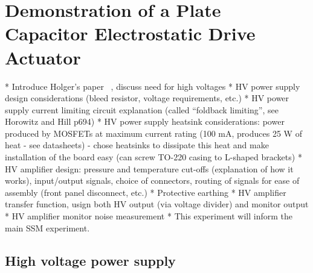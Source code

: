 \chapter{Demonstration of a Plate Capacitor Electrostatic Drive Actuator}
\label{c:esd-concept}

* Introduce Holger's paper~\cite{Wittel2015} \etal, discuss need for high voltages
* HV power supply design considerations (bleed resistor, voltage requirements, etc.)
* HV power supply current limiting circuit explanation (called ``foldback limiting'', see Horowitz and Hill p694)
* HV power supply heatsink considerations: power produced by MOSFETs at maximum current rating (100 mA, produces 25 W of heat - see datasheets) - chose heatsinks to dissipate this heat and make installation of the board easy (can screw TO-220 casing to L-shaped brackets)
* HV amplifier design: pressure and temperature cut-offs (explanation of how it works), input/output signals, choice of connectors, routing of signals for ease of assembly (front panel disconnect, etc.)
* Protective earthing
* HV amplifier transfer function, usign both HV output (via voltage divider) and monitor output
* HV amplifier monitor noise measurement
* This experiment will inform the main SSM experiment.

\section{High voltage power supply}


\newcommand{\ESDFORCEGRAD}{\SI{-3.68}{\nano\newton\per\volt}}

\newcommand{\ESDMAXVOLTAGE}{\SI{750}{\volt}}

\newcommand{\ESDMAXFORCE}{\SI{-1.48e-6}{\micro\newton}}

